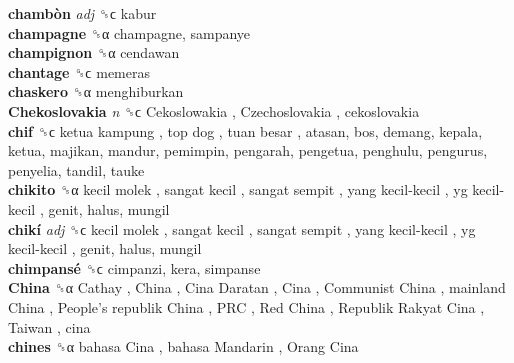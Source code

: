 \textbf{chambòn} \emph{adj}  ␝ϲ  kabur  \\
\textbf{champagne} ␝α  champagne, sampanye  \\
\textbf{champignon} ␝α  cendawan  \\
\textbf{chantage} ␝ϲ  memeras  \\
\textbf{chaskero} ␝α  menghiburkan  \\
\textbf{Chekoslovakia} \emph{n}  ␝ϲ   Cekoslowakia ,  Czechoslovakia , cekoslovakia  \\
\textbf{chif} ␝ϲ   ketua kampung ,  top dog ,  tuan besar , atasan, bos, demang, kepala, ketua, majikan, mandur, pemimpin, pengarah, pengetua, penghulu, pengurus, penyelia, tandil, tauke  \\
\textbf{chikito} ␝α   kecil molek ,  sangat kecil ,  sangat sempit ,  yang kecil-kecil ,  yg kecil-kecil , genit, halus, mungil  \\
\textbf{chikí} \emph{adj}  ␝ϲ   kecil molek ,  sangat kecil ,  sangat sempit ,  yang kecil-kecil ,  yg kecil-kecil , genit, halus, mungil  \\
\textbf{chimpansé} ␝ϲ  cimpanzi, kera, simpanse  \\
\textbf{China} ␝α   Cathay ,  China ,  Cina Daratan ,  Cina ,  Communist China ,  mainland China ,  People’s republik China ,  PRC ,  Red China ,  Republik Rakyat Cina ,  Taiwan , cina  \\
\textbf{chines} ␝α   bahasa Cina ,  bahasa Mandarin ,  Orang Cina   \\
